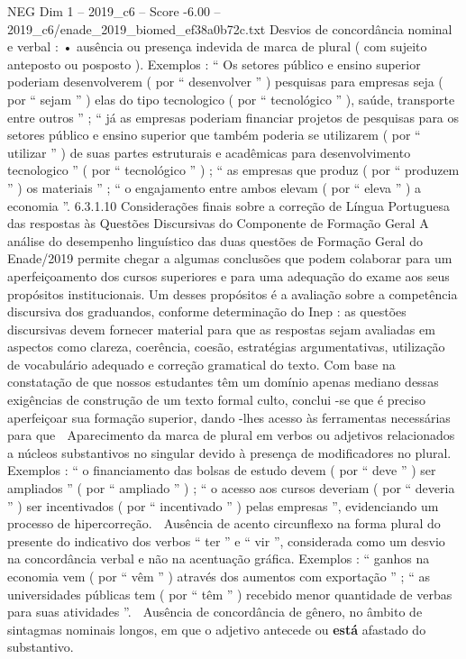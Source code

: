 \begin{textsample}{NEG Dim 1 – 2019\_c6 – Score -6.00 – 2019\_c6/enade\_2019\_biomed\_ef38a0b72c.txt}
Desvios de concordância nominal e verbal : • ausência ou presença indevida de marca de plural ( com sujeito anteposto ou posposto ).
Exemplos : “ Os setores público e ensino superior poderiam desenvolverem ( por “ desenvolver ” ) pesquisas para empresas seja ( por “ sejam ” ) elas do tipo tecnologico ( por “ tecnológico ” ), saúde, transporte entre outros ” ; “ já as empresas poderiam financiar projetos de pesquisas para os setores público e ensino superior que também poderia se utilizarem ( por “ utilizar ” ) de suas partes estruturais e acadêmicas para desenvolvimento tecnologico ” ( por “ tecnológico ” ) ; “ as empresas que produz ( por “ produzem ” ) os materiais ” ; “ o engajamento entre ambos elevam ( por “ eleva ” ) a economia ”. 6.3.1.10 Considerações finais sobre a correção de Língua Portuguesa das respostas às Questões Discursivas do Componente de Formação Geral A análise do desempenho linguístico das duas questões de Formação Geral do Enade/2019 permite chegar a algumas conclusões que podem colaborar para um aperfeiçoamento dos cursos superiores e para uma adequação do exame aos seus propósitos institucionais.
Um desses propósitos é a avaliação sobre a competência discursiva dos graduandos, conforme determinação do Inep : as questões discursivas devem fornecer material para que as respostas sejam avaliadas em aspectos como clareza, coerência, coesão, estratégias argumentativas, utilização de vocabulário adequado e correção gramatical do texto.
Com base na constatação de que nossos estudantes têm um domínio apenas mediano dessas exigências de construção de um texto formal culto, conclui -se que é preciso aperfeiçoar sua formação superior, dando -lhes acesso às ferramentas necessárias para que  Aparecimento da marca de plural em verbos ou adjetivos relacionados a núcleos substantivos no singular devido à presença de modificadores no plural.
Exemplos : “ o financiamento das bolsas de estudo devem ( por “ deve ” ) ser ampliados ” ( por “ ampliado ” ) ; “ o acesso aos cursos deveriam ( por “ deveria ” ) ser incentivados ( por “ incentivado ” ) pelas empresas ”, evidenciando um processo de hipercorreção.  Ausência de acento circunflexo na forma plural do presente do indicativo dos verbos “ ter ” e “ vir ”, considerada como um desvio na concordância verbal e não na acentuação gráfica.
Exemplos : “ ganhos na economia vem ( por “ vêm ” ) através dos aumentos com exportação ” ; “ as universidades públicas tem ( por “ têm ” ) recebido menor quantidade de verbas para suas atividades ”.  Ausência de concordância de gênero, no âmbito de sintagmas nominais longos, em que o adjetivo antecede ou \textbf{está} afastado do substantivo.

\end{textsample}
